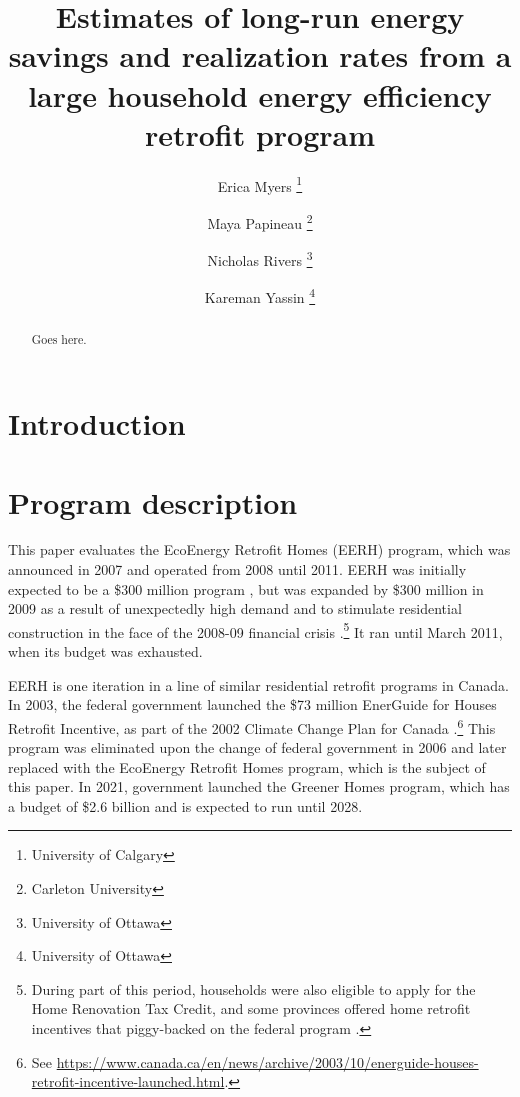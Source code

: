 \documentclass{article}
\author{
    Erica Myers \thanks{University of Calgary}
    \and
    Maya Papineau \thanks{Carleton University}
    \and
    Nicholas Rivers \thanks{University of Ottawa}
    \and 
    Kareman Yassin \thanks{University of Ottawa}
}
\title{
    Estimates of long-run energy savings and realization rates from a large household energy efficiency retrofit program
}
\begin{document}
\maketitle

\begin{abstract}
	Goes here.
\end{abstract}

\section{Introduction}

\section{Program description}
This paper evaluates the EcoEnergy Retrofit Homes (EERH) program, which was announced in 2007 and operated from 2008 until 2011. EERH was initially expected to be a \$300 million program \citep{budget2007}, but was expanded by \$300 million in 2009 as a result of unexpectedly high demand and to stimulate residential construction in the face of the 2008-09 financial crisis \citep{budget2009}.\footnote{During part of this period, households were also eligible to apply for the Home Renovation Tax Credit, and some provinces offered home retrofit incentives that piggy-backed on the federal program \citep{rivers2016free}.} It ran until March 2011, when its budget was exhausted.

EERH is one iteration in a line of similar residential retrofit programs in Canada. In 2003, the federal government launched the \$73 million EnerGuide for Houses Retrofit Incentive, as part of the 2002 Climate Change Plan for Canada \citep{canada2002climateplan}.\footnote{See \url{https://www.canada.ca/en/news/archive/2003/10/energuide-houses-retrofit-incentive-launched.html}.} This program was eliminated upon the change of federal government in 2006 and later replaced with the EcoEnergy Retrofit Homes program, which is the subject of this paper. In 2021, government launched the Greener Homes program, which has a budget of \$2.6 billion and is expected to run until 2028.
\end{document}
